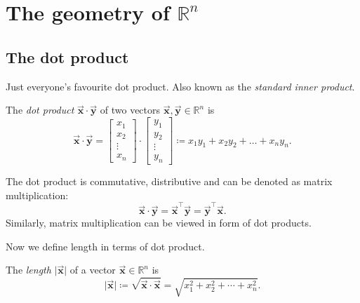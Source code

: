 \documentclass[12pt]{article}
\theoremstyle{remark}
\let\oldvec = \vec
\renewcommand{\vec}[1]{\oldvec{\mathbf{#1}}}
\numberwithin{equation}{section}
\begin{document}
\section{The geometry of $ \mathbb{R}^n $}%

\subsection{The dot product}%
\label{sub:The dot product}
Just everyone's favourite dot product. Also known as the \textit{standard inner product}.

\begin{definition}
	The \textit{dot product} $ \vec{x} \cdot \vec{y} $ of two vectors $ \vec{x}, \vec{y} \in \mathbb{R}^n $ is 
	\begin{equation}
		\vec{x} \cdot \vec{y} = 
		\begin{bmatrix}
			x_{1} \\
			x_{2} \\
			\vdots \\
			x_{n}
		\end{bmatrix}
                \cdot
		\begin{bmatrix}
			y_{1} \\
			y_{2} \\
			\vdots \\
			y_{n}
		\end{bmatrix}
		\coloneqq x_{1}y_{1} + x_{2}y_{2} + \ldots + x_{n}y_{n}.
	\end{equation}
\end{definition}


The dot product is commutative, distributive and can be denoted as matrix multiplication: 
\[ \vec{x} \cdot \vec{y} = \vec{x}^{\top} \vec{y} = \vec{y}^{\top} \vec{x}.\] 
Similarly, matrix multiplication can be viewed in form of dot products. \par

Now we define length in terms of dot product. 

\begin{definition}
	The \textit{length} $ \lvert \vec{x} \rvert $ of a vector $ \vec{x} \in \mathbb{R}^n $ is
	\begin{equation}
		\lvert \vec{x} \rvert \coloneqq \sqrt{\vec{x} \cdot \vec{x}} = \sqrt{x_{1}^{2} + x_{2}^{2} + \cdots + x_{n}^{2}}.
	\end{equation}
	
\end{definition}
\end{document}
